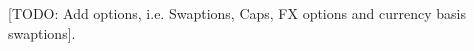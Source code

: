 \documentclass[11pt,english]{amsart}
\newcommand{\EE}{\mathbb{E}}
\newcommand{\f}{\ell}
\theoremstyle{definition}
\newtheorem{rema}{Remark}
\begin{document}
\begin{itemize}
\end{itemize}

[TODO: Add options, i.e. Swaptions, Caps, FX options and currency basis swaptions].

%
\end{document}
